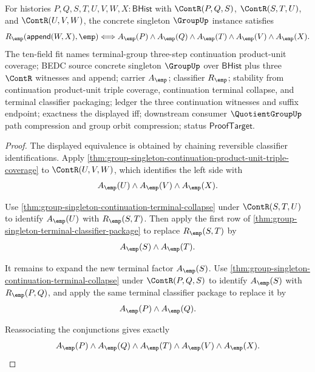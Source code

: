\begin{theorem}
\label{thm:group-singleton-triple-continuation-product-unit-chain-coverage}
For histories $P,Q,S,T,U,V,W,X:\mathsf{BHist}$ with $\ContR(P,Q,S)$,
$\ContR(S,T,U)$, and $\ContR(U,V,W)$, the concrete singleton $\GroupUp$
instance satisfies
$$
R_{\emp}(\mathsf{append}(W,X),\emp)\Longleftrightarrow
A_{\emp}(P)\land A_{\emp}(Q)\land A_{\emp}(T)\land A_{\emp}(V)\land
A_{\emp}(X).
$$
The ten-field fit names terminal-group three-step continuation product-unit
coverage; BEDC source concrete singleton $\GroupUp$ over $\mathsf{BHist}$ plus
three $\ContR$ witnesses and append; carrier $A_{\emp}$; classifier
$R_{\emp}$; stability from continuation product-unit triple coverage,
continuation terminal collapse, and terminal classifier packaging; ledger the
three continuation witnesses and suffix endpoint; exactness the displayed iff;
downstream consumer $\QuotientGroupUp$ path compression and group orbit
compression; status $\mathsf{ProofTarget}$.
\end{theorem}
\begin{proof}
The displayed equivalence is obtained by chaining reversible classifier
identifications. Apply
\autoref{thm:group-singleton-continuation-product-unit-triple-coverage} to
$\ContR(U,V,W)$, which identifies the left side with
$$
A_{\emp}(U)\land A_{\emp}(V)\land A_{\emp}(X).
$$

Use \autoref{thm:group-singleton-continuation-terminal-collapse} under
$\ContR(S,T,U)$ to identify $A_{\emp}(U)$ with $R_{\emp}(S,T)$. Then apply the
first row of \autoref{thm:group-singleton-terminal-classifier-package} to
replace $R_{\emp}(S,T)$ by
$$
A_{\emp}(S)\land A_{\emp}(T).
$$

It remains to expand the new terminal factor $A_{\emp}(S)$. Use
\autoref{thm:group-singleton-continuation-terminal-collapse} under
$\ContR(P,Q,S)$ to identify $A_{\emp}(S)$ with $R_{\emp}(P,Q)$, and apply the
same terminal classifier package to replace it by
$$
A_{\emp}(P)\land A_{\emp}(Q).
$$

Reassociating the conjunctions gives exactly
$$
A_{\emp}(P)\land A_{\emp}(Q)\land A_{\emp}(T)\land A_{\emp}(V)\land
A_{\emp}(X).
$$
\end{proof}
